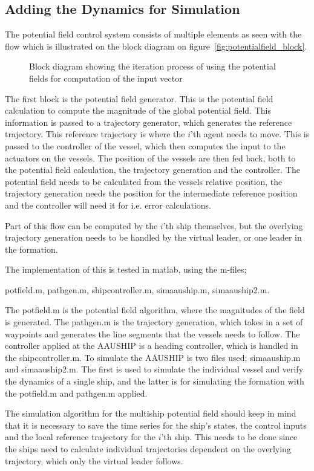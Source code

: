 \subsection{Adding the Dynamics for Simulation}
The potential field control system consists of multiple elements
as seen with the flow which is illustrated on the block diagram on
figure~\vref{fig:potentialfield_block}.
\begin{figure}[htbp]
\centering

\caption{Block diagram showing the iteration process of using the
potential fields for computation of the input vector}
\label{fig:potentialfield_block}
\end{figure}
The first block is the potential field generator. This is the potential field calculation to compute the magnitude of the global potential field. This information is passed to a trajectory generator, which generates the reference trajectory. This reference trajectory is where the $i$'th agent needs to move. This is passed to the controller of the vessel, which then computes the input to the actuators on the vessels. The position of the vessels are then fed back, both to the potential field calculation, the trajectory generation and the controller. The potential field needs to be calculated from the vessels relative position, the trajectory generation needs the position for the intermediate reference position and the controller will need it for i.e. error calculations.

Part of this flow can be computed by the $i$'th ship themselves, but the overlying trajectory generation needs to be handled by the virtual leader, or one leader in the formation.

The implementation of this is tested in matlab, using the m-files;

potfield.m, pathgen.m, shipcontroller.m, simaauship.m, simaauship2.m.

The potfield.m is the potential field algorithm, where the magnitudes of the field is generated. The pathgen.m is the trajectory generation, which takes in a set of waypoints and generates the line segments that the vessels needs to follow. The controller applied at the AAUSHIP is a heading controller, which is handled in the shipcontroller.m. To simulate the AAUSHIP is two files used; simaauship.m and simaauship2.m. The first is used to simulate the individual vessel and verify the dynamics of a single ship, and the latter is for simulating the formation with the potfield.m and pathgen.m applied.

The simulation algorithm for the multiship potential field should keep
in mind that it is necessary to save the time series for the ship's states, the control inputs and the local reference trajectory for the $i$'th ship. This needs to be done since the ships need to calculate individual trajectories dependent on the overlying trajectory, which only the virtual leader follows.

